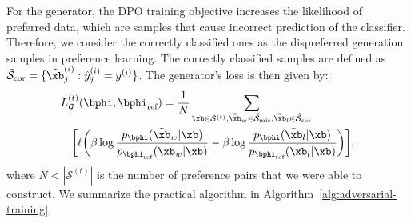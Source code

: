 For the generator, the DPO training objective increases the likelihood of preferred data, which are samples that cause incorrect prediction of the classifier. Therefore, we consider the correctly classified ones as the dispreferred generation samples in preference learning. The correctly classified samples are defined as $\tilde{\mathcal{S}}_{\text{cor}} = \{\tilde{\xb}_j^{(i)} : \hat{y}_j^{(i)} = y^{(i)}\}$. 
The generator's loss is then given by:
\begin{align}
    &L^{(t)}_{\mathcal{G}}(\bphi, \bphi_{\text{ref}}) = \frac{1}{N}\sum_{\xb\in\mathcal{S}^{(t)}, \tilde{\xb}_w \in \tilde{\mathcal{S}}_{\text{mis}}, \tilde{\xb}_l \in \tilde{\mathcal{S}}_{\text{cor}}} \nonumber \\
    &\quad \bigg[\ell\bigg(\beta \log \frac{p_{\bphi}(\tilde{\xb}_w | \xb)}{p_{\bphi_{\text{ref}}}(\tilde{\xb}_w | \xb)} - \beta \log \frac{p_{\bphi}(\tilde{\xb}_l | \xb)}{p_{\bphi_{\text{ref}}}(\tilde{\xb}_l | \xb)}\bigg)\bigg],\label{eq:dpo_loss}
\end{align}
where $N < |\mathcal{S}^{(t)}|$ is the number of preference pairs that we were able to construct. We summarize the practical algorithm in Algorithm~\ref{alg:adversarial-training}. 

